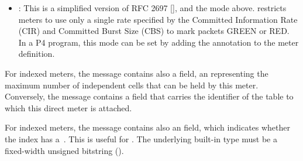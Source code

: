 \documentclass[11pt]{article}
\begin{document}
{\begin{itemize}
\begin{itemize}[noitemsep,topsep=\mdcompacttopsep]
\item{}: This is a simplified version of RFC 2697
[], and the  mode above.
 restricts meters to use only a single rate
specified by the Committed Information Rate (CIR) and Committed Burst Size
(CBS) to mark packets GREEN or RED. In a P4 program, this mode can be set
by adding the  annotation to the meter definition.%
\end{itemize}%
\end{itemize}%

\noindent{}For indexed meters, the  message contains also a  field, an 
representing the maximum number of independent cells that can be held by this
meter. Conversely, the  message contains a  field
that carries the  identifier of the table to which this direct meter is
attached.%

For indexed meters, the  message contains also an 
field, which indicates whether the index has a~. This is useful for
. The underlying built-in type must
be a fixed-width unsigned bitstring ().%

}
\end{document}
